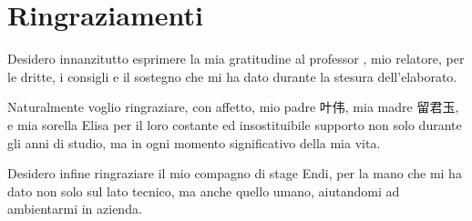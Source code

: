 \cleardoublepage
{}
{}

\begingroup
\let\clearpage\relax
\let\cleardoublepage\relax
\let\cleardoublepage\relax

\chapter*{Ringraziamenti}

\noindent Desidero innanzitutto esprimere la mia gratitudine al professor \myProf, mio relatore, per le dritte, i consigli e il sostegno che mi ha dato durante la stesura dell'elaborato.

\vspace{0.35cm}

\begin{CJK*}{UTF8}{gbsn}
\noindent Naturalmente voglio ringraziare, con affetto, mio padre 叶伟, mia madre 留君玉, e mia sorella Elisa per il loro costante ed insostituibile supporto non solo durante gli anni di studio, ma in ogni momento significativo della mia vita.
\end{CJK*}

\vspace{0.35cm}

\noindent Desidero infine ringraziare il mio compagno di stage Endi, per la mano che mi ha dato non solo sul lato tecnico, ma anche quello umano, aiutandomi ad ambientarmi in azienda.

\vspace{0.75cm}

\noindent{\myLocation, \myTime}
\hfill \textit{\myName}

\endgroup
